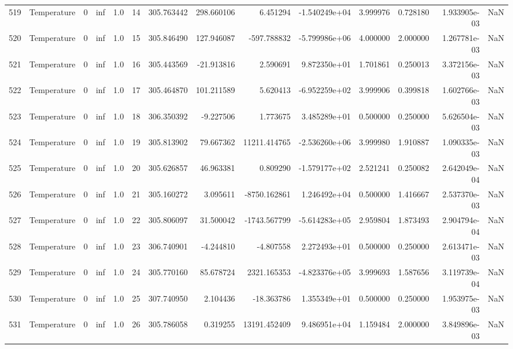 \begin{tabular}{llrrrrrrrrrrrr}
519 &  Temperature &       0 &  inf &  1.0 &   14 &  305.763442 &   298.660106 &       6.451294 & -1.540249e+04 &  3.999976 &  0.728180 &  1.933905e-03 &      NaN \\
520 &  Temperature &       0 &  inf &  1.0 &   15 &  305.846490 &   127.946087 &    -597.788832 & -5.799986e+06 &  4.000000 &  2.000000 &  1.267781e-03 &      NaN \\
521 &  Temperature &       0 &  inf &  1.0 &   16 &  305.443569 &   -21.913816 &       2.590691 &  9.872350e+01 &  1.701861 &  0.250013 &  3.372156e-03 &      NaN \\
522 &  Temperature &       0 &  inf &  1.0 &   17 &  305.464870 &   101.211589 &       5.620413 & -6.952259e+02 &  3.999906 &  0.399818 &  1.602766e-03 &      NaN \\
523 &  Temperature &       0 &  inf &  1.0 &   18 &  306.350392 &    -9.227506 &       1.773675 &  3.485289e+01 &  0.500000 &  0.250000 &  5.626504e-03 &      NaN \\
524 &  Temperature &       0 &  inf &  1.0 &   19 &  305.813902 &    79.667362 &   11211.414765 & -2.536260e+06 &  3.999980 &  1.910887 &  1.090335e-03 &      NaN \\
525 &  Temperature &       0 &  inf &  1.0 &   20 &  305.626857 &    46.963381 &       0.809290 & -1.579177e+02 &  2.521241 &  0.250082 &  2.642049e-04 &      NaN \\
526 &  Temperature &       0 &  inf &  1.0 &   21 &  305.160272 &     3.095611 &   -8750.162861 &  1.246492e+04 &  0.500000 &  1.416667 &  2.537370e-03 &      NaN \\
527 &  Temperature &       0 &  inf &  1.0 &   22 &  305.806097 &    31.500042 &   -1743.567799 & -5.614283e+05 &  2.959804 &  1.873493 &  2.904794e-04 &      NaN \\
528 &  Temperature &       0 &  inf &  1.0 &   23 &  306.740901 &    -4.244810 &      -4.807558 &  2.272493e+01 &  0.500000 &  0.250000 &  2.613471e-03 &      NaN \\
529 &  Temperature &       0 &  inf &  1.0 &   24 &  305.770160 &    85.678724 &    2321.165353 & -4.823376e+05 &  3.999693 &  1.587656 &  3.119739e-04 &      NaN \\
530 &  Temperature &       0 &  inf &  1.0 &   25 &  307.740950 &     2.104436 &     -18.363786 &  1.355349e+01 &  0.500000 &  0.250000 &  1.953975e-03 &      NaN \\
531 &  Temperature &       0 &  inf &  1.0 &   26 &  305.786058 &     0.319255 &   13191.452409 &  9.486951e+04 &  1.159484 &  2.000000 &  3.849896e-03 &      NaN \\

\end{tabular}
